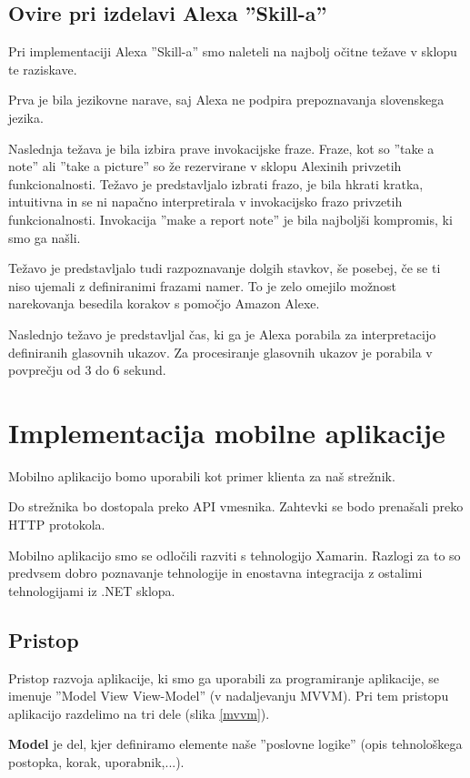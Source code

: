 \documentclass[a4paper, 12pt]{book}
\begin{document}
\subsection{Ovire pri izdelavi Alexa ''Skill-a''}

Pri implementaciji Alexa ''Skill-a'' smo naleteli na najbolj očitne težave v sklopu te raziskave.

Prva je bila jezikovne narave, saj Alexa ne podpira prepoznavanja slovenskega jezika.

Naslednja težava je bila izbira prave invokacijske fraze.
Fraze, kot so ''take a note'' ali ''take a picture'' so že rezervirane v sklopu Alexinih privzetih funkcionalnosti.
Težavo je predstavljalo izbrati frazo, je bila hkrati kratka, intuitivna in se ni napačno interpretirala v invokacijsko frazo privzetih funkcionalnosti.
Invokacija ''make a report note'' je bila najboljši kompromis, ki smo ga našli.

Težavo je predstavljalo tudi razpoznavanje dolgih stavkov, še posebej, če se ti niso ujemali z definiranimi frazami namer.
To je zelo omejilo možnost narekovanja besedila korakov s pomočjo Amazon Alexe.

Naslednjo težavo je predstavljal čas, ki ga je Alexa porabila za interpretacijo definiranih glasovnih ukazov.
Za procesiranje glasovnih ukazov je porabila v povprečju od 3 do 6 sekund.

\section{Implementacija mobilne aplikacije}

Mobilno aplikacijo bomo uporabili kot primer klienta za naš strežnik.

Do strežnika bo dostopala preko API vmesnika.
Zahtevki se bodo prenašali preko HTTP protokola.

Mobilno aplikacijo smo se odločili razviti s tehnologijo Xamarin.
Razlogi za to so predvsem dobro poznavanje tehnologije in enostavna integracija z ostalimi tehnologijami iz .NET sklopa.


\subsection{Pristop}
Pristop razvoja aplikacije, ki smo ga uporabili za programiranje aplikacije, se imenuje ''Model View View-Model'' (v nadaljevanju MVVM).
Pri tem pristopu aplikacijo razdelimo na tri dele (slika \ref{mvvm}).

\textbf{Model} je del, kjer definiramo elemente naše ''poslovne logike'' (opis tehnološkega postopka, korak, uporabnik,...).
\end{document}
